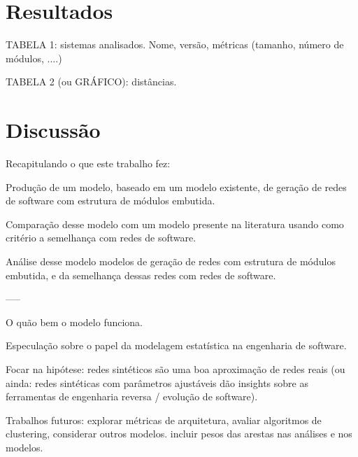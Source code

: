 \documentclass{acm_proc_article-sp}
\begin{document}

\section{Resultados} %

TABELA 1: sistemas analisados. Nome, versão, métricas (tamanho, número de módulos, ....)

TABELA 2 (ou GRÁFICO): distâncias.


\section{Discussão} %

Recapitulando o que este trabalho fez:

Produção de um modelo, baseado em um modelo existente, de geração de redes de software com estrutura de módulos embutida.

Comparação desse modelo com um modelo presente na literatura usando como critério a semelhança com redes de software.

Análise desse modelo modelos de geração de redes com estrutura de módulos embutida, e da semelhança dessas redes com redes de software.

-----

O quão bem o modelo funciona.

Especulação sobre o papel da modelagem estatística na engenharia de software.

Focar na hipótese: redes sintéticos são uma boa aproximação de redes reais (ou ainda: redes sintéticas com parâmetros ajustáveis dão insights sobre as ferramentas de engenharia reversa / evolução de software).




Trabalhos futuros: explorar métricas de arquitetura, avaliar algoritmos de clustering, considerar outros modelos.
incluir pesos das arestas nas análises e nos modelos.



\end{document}
